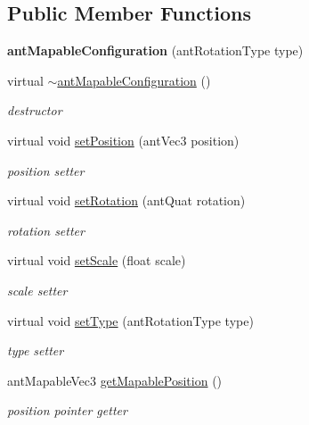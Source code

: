 \subsection*{Public Member Functions}
\begin{DoxyCompactItemize}
\item 
\hypertarget{classant_mapable_configuration_a2617ce19af5d343f72205f74a764bcd7}{{\bfseries ant\+Mapable\+Configuration} (ant\+Rotation\+Type type)}\label{classant_mapable_configuration_a2617ce19af5d343f72205f74a764bcd7}

\item 
virtual \hyperlink{classant_mapable_configuration_ae8a4e2e32f16d82307d698526eeaa3d2}{$\sim$ant\+Mapable\+Configuration} ()
\begin{DoxyCompactList}\small\item\em destructor \end{DoxyCompactList}\item 
virtual void \hyperlink{classant_mapable_configuration_a0c868ba3a8773ad918d868fe0443f454}{set\+Position} (ant\+Vec3 position)
\begin{DoxyCompactList}\small\item\em position setter \end{DoxyCompactList}\item 
virtual void \hyperlink{classant_mapable_configuration_aface0ddcf2b7b664d95182a6ef3bb49f}{set\+Rotation} (ant\+Quat rotation)
\begin{DoxyCompactList}\small\item\em rotation setter \end{DoxyCompactList}\item 
virtual void \hyperlink{classant_mapable_configuration_a548a00bee9290bd14419d46a56609f13}{set\+Scale} (float scale)
\begin{DoxyCompactList}\small\item\em scale setter \end{DoxyCompactList}\item 
virtual void \hyperlink{classant_mapable_configuration_a2976225cdfb5febabd7374b742aec8db}{set\+Type} (ant\+Rotation\+Type type)
\begin{DoxyCompactList}\small\item\em type setter \end{DoxyCompactList}\item 
ant\+Mapable\+Vec3 \hyperlink{classant_mapable_configuration_ad7ca2e5ed86e3f7f9e08b25e41c8178f}{get\+Mapable\+Position} ()
\begin{DoxyCompactList}\small\item\em position pointer getter \end{DoxyCompactList}\item 

\end{DoxyCompactItemize}
